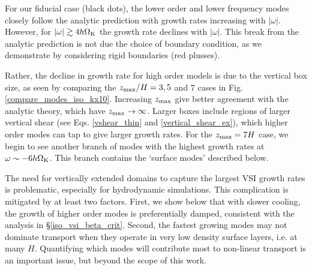 For our fiducial case (black dots), the lower order and lower
frequency modes closely follow the analytic prediction with growth
rates increasing with $|\omega|$. %
However, for $|\omega| \gtrsim 4 h \Omega_{\rm K}$ the growth rate declines with
$|\omega|$.  This break from the analytic prediction is not due the
choice of boundary condition, as we demonstrate by considering rigid
boundaries (red plusses). 

Rather, the decline in growth rate for high order models is due to the
vertical box size, as seen by comparing the $z_\mathrm{max}/H = 3, 5$ and 7
cases in Fig. \ref{compare_modes_iso_kx10}. Increasing $z_\mathrm{max}$ give
better agreement with the analytic theory, which have $z_\mathrm{max} \to  
\infty$. Larger boxes include regions of larger vertical shear (see
Eqs. \ref{vshear_thin} and \ref{vertical_shear_ex}), which higher
order modes can tap to give larger growth rates. For the $z_\mathrm{max} = 7
H$ case, we begin to see another branch of modes with the highest
growth rates at $\omega \sim -6 h\Omega_{\rm K}$. This branch contains the
`surface modes' described below.   

The need for vertically extended domains to capture the largest VSI
growth rates is problematic, especially for hydrodynamic simulations.
This  complication is mitigated by at least two factors.  First, we
show below that with slower cooling, the growth of higher order modes
is preferentially damped, consistent with the analysis in
\S\ref{iso_vsi_beta_crit}.  Second, the fastest growing modes may not
dominate transport when they operate in very low density  surface
layers, i.e. at many $H$. Quantifying which modes will contribute
most to non-linear transport is an important issue, but beyond the
scope of this work. 




